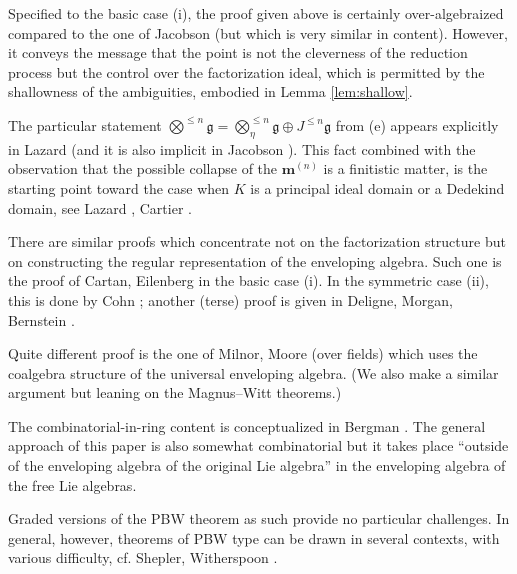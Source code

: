 \documentclass[11pt,a4paper]{amsart}
\newcommand{\bo}{\boldsymbol}
\theoremstyle{definition}
\theoremstyle{plain}
\begin{document}
Specified to the basic case (i), the proof given above is certainly over-algebraized compared to the one of Jacobson \cite{J}
 (but which is very similar in content).
However, it conveys the message that the point is not the cleverness of the reduction process
 but the control over the factorization ideal, which is permitted by the shallowness
 of the ambiguities, embodied in Lemma \ref{lem:shallow}.

The particular statement  ${\textstyle{\bigotimes}^{\leq n}\mathfrak g} =
 {\textstyle{\bigotimes}^{\leq n}_\eta\mathfrak g} \oplus
 {\textstyle{J^{\leq n}\mathfrak g}}$ from (e) appears explicitly in Lazard \cite{L}
 (and it is also implicit in Jacobson \cite{J}).
This fact combined with the observation that the possible collapse of the $\bo m^{(n)}$ is a finitistic matter,
 is the starting point toward the case when $K$ is a principal ideal domain or a Dedekind domain,
 see Lazard \cite{L}, Cartier \cite{C}.


There are similar proofs which concentrate not on the factorization structure but on constructing
 the regular representation of the enveloping algebra.
Such one is the proof of Cartan, Eilenberg \cite{CE} in the basic case (i).
In the symmetric case (ii), this is done by Cohn \cite{CC};
 another (terse) proof is given in Deligne, Morgan, Bernstein \cite{DMB}.

Quite different proof is the one of Milnor, Moore \cite{MiMo} (over fields)
 which uses the coalgebra structure of the universal enveloping algebra.
(We also make a similar argument but leaning on the Magnus--Witt theorems.)

The combinatorial-in-ring content is conceptualized in
Bergman \cite{Ber}.
The general approach of this paper is also somewhat combinatorial but it takes place ``outside of
 the enveloping algebra of the original Lie algebra'' in the enveloping algebra of
 the free Lie algebras.

Graded versions of the PBW theorem as such provide no particular challenges.
In general, however, theorems of PBW type can be drawn in several contexts, with various
difficulty,
cf. Shepler, Witherspoon \cite{SW}.  
\end{document}
